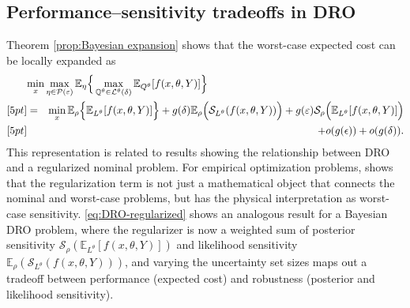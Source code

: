 \documentclass[11pt,reqno,letter]{amsart}
\theoremstyle{plain}
\theoremstyle{definition}
\newtheorem{remark}[theorem]{Remark}
\numberwithin{equation}{section}
\numberwithin{theorem}{section}
\numberwithin{table}{section}
\numberwithin{figure}{section}
\begin{document}
\subsection{Performance--sensitivity tradeoffs in DRO}
\label{sec:DROtradeoff}

Theorem \ref{prop:Bayesian expansion} shows that the  worst-case expected cost can be locally expanded as
\begin{eqnarray}
\lefteqn{\min_x \max_{\eta \in {\mathcal P}(\varepsilon)} {\mathbb E}_\eta \Big\{\max_{{\mathbb Q}^\theta \in {\mathcal L}^\theta(\delta)} {\mathbb E}_{Q^\theta} [f(x, \theta, Y)] \Big\}}
\label{eq:DRO-regularized}
\\ [5pt]
& = & \min_x {\mathbb E}_\rho\Big\{{\mathbb E}_{L^\theta}[f(x, \theta, Y)]\Big\}+ g(\delta) {\mathbb E}_\rho \Big({\mathcal S}_{L^\theta}(f(x, \theta, Y))\Big) + g(\varepsilon)  {\mathcal S}_\rho\Big({\mathbb E}_{L^\theta}[f(x, \theta, Y)]\Big) 
\nonumber  \\ [5pt] 
& & + o(g({\epsilon})) + o(g({\delta})).
\nonumber
\end{eqnarray}
This representation is related to results showing the relationship between DRO and a regularized nominal problem. For empirical optimization problems, \cite{gotoh2026sensitivity} shows that the regularization term is not just a mathematical object that connects the nominal and worst-case problems, but  has the physical interpretation as worst-case sensitivity. \eqref{eq:DRO-regularized} shows an analogous result for a Bayesian DRO problem, where the regularizer is now a weighted sum of posterior  sensitivity ${\mathcal S}_\rho({\mathbb E}_{L^\theta}[f(x, \theta, Y)])$   and likelihood sensitivity ${\mathbb E}_\rho ({\mathcal S}_{L^\theta}(f(x, \theta, Y)))$, and varying the uncertainty set sizes maps out a tradeoff between performance (expected cost) and robustness (posterior and likelihood sensitivity). 






\end{document}
